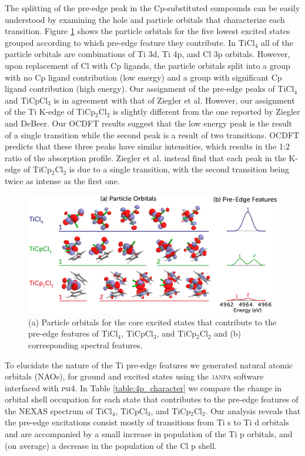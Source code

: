 \documentclass{article}
\begin{document}
The splitting of the pre-edge peak in the Cp-substituted compounds can be easily understood by examining the hole and particle orbitals that characterize each transition.
Figure \ref{fig:Ti-MOs} shows the particle orbitals for the five lowest excited states grouped according to which pre-edge feature they contribute.
In TiCl$_4$ all of the particle orbitals are combinations of Ti 3d, Ti 4p, and Cl 3p orbitals.
However, upon replacement of Cl with Cp ligands, the particle orbitals split into a group with no Cp ligand contribution (low energy) and a group with significant Cp ligand contribution (high energy).
Our assignment of the pre-edge peaks of TiCl$_4$ and TiCpCl$_3$ is in agreement with that of Ziegler et al.\cite{TiCl4-Zeigler}
However, our assignment of the Ti K-edge of TiCp$_2$Cl$_2$ is slightly different from the one reported by Ziegler\cite{TiCl4-Zeigler} and DeBeer.\cite{TiCl4}
Our OCDFT results suggest that the low energy peak is the result of a single transition while the second peak is a result of two transitions.
OCDFT predicts that these three peaks have similar intensities, which results in the 1:2 ratio of the absorption profile.
Ziegler et al.\cite{TiCl4-Zeigler} instead find that each peak in the K-edge of TiCp$_2$Cl$_2$ is due to a single transition, with the second transition being twice as intense as the first one.

\begin{figure}[t!]
	\centering
	\includegraphics[width=6in]{figure_5.png}
	\caption{(a) Particle orbitals for the core excited states that contribute to the pre-edge features of TiCl$_4$, TiCpCl$_3$, and TiCp$_2$Cl$_2$ and (b) corresponding spectral features.}
	\label{fig:Ti-MOs}
\end{figure}

To elucidate the nature of the Ti pre-edge features we generated natural atomic orbitals (NAOs),\cite{NBOs} for ground and excited states using the \textsc{janpa}\cite{nikolaienko_janpa:_2014} software interfaced with \textsc{psi4}\cite{PSI4}.
In Table \ref{table:4p_character} we compare the change in orbital shell occupation for each state that contributes to the pre-edge features of the NEXAS spectrum of TiCl$_4$, TiCpCl$_3$, and TiCp$_2$Cl$_2$.
Our analysis reveals that the pre-edge excitations consist mostly of transitions from Ti s to Ti d orbitals and are accompanied by a small increase in population of the Ti p orbitals, and (on average) a decrease in the population of the Cl p shell.
\end{document}
